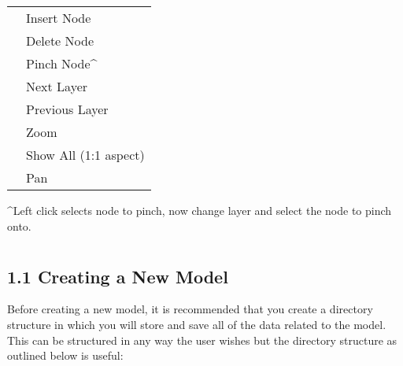 \documentclass[a4paper,12pt,english]{sphinxmanual}
\begin{document}
\section{}
\label{\detokenize{manual__keyboard_shortcuts:keys}}\label{\detokenize{manual__keyboard_shortcuts:keyboard-shortcuts}}\label{\detokenize{manual__keyboard_shortcuts::doc}}

\begin{savenotes}\sphinxattablestart
\centering
\begin{tabulary}{\linewidth}[t]{|T|T|}
\hline
{}\relax &\relax \\
\hline
{}
&
Insert Node
\\
\hline
{}
&
Delete Node
\\
\hline
{}
&
Pinch Node\textasciicircum{}
\\
\hline
\sphinxstylestrong{\textgreater{}}
&
Next Layer
\\
\hline
\sphinxstylestrong{\textless{}}
&
Previous Layer
\\
\hline
{}
&
Zoom
\\
\hline
{}
&
Show All (1:1 aspect)
\\
\hline
{}
&
Pan
\\
\hline
\end{tabulary}
\par
\sphinxattableend\end{savenotes}

\textasciicircum{}Left click selects node to pinch, now change layer and select the node to pinch onto.


\section{}
\label{\detokenize{manual__models:models}}\label{\detokenize{manual__models::doc}}
\begin{DUlineblock}{0em}
\item[] 
\end{DUlineblock}


\subsection{1.1 Creating a New Model}
\label{\detokenize{manual__models:creating-a-new-model}}
Before creating a new model, it is recommended that you create a directory structure in which you will store and save
all of the data related to the model. This can be structured in any way the user wishes but the directory structure
as outlined below is useful:
\end{document}
